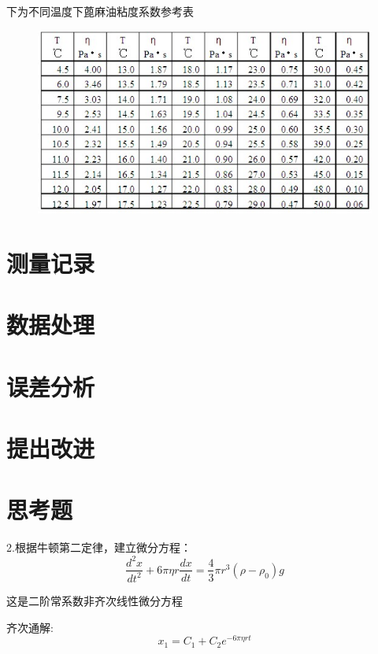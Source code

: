 \documentclass[UTF8]{ctexart}
\begin{document}
下为不同温度下蓖麻油粘度系数参考表
\begin{figure}[ht]
    \centering 
    \includegraphics[width=13cm]{standard table.jpeg}
\end{figure}




    \section{测量记录}

    \section{数据处理}

    \section{误差分析}

    \section{提出改进}
    
    \section{思考题}
    2.根据牛顿第二定律，建立微分方程：
    \begin{equation}
        \frac{d^2x}{dt^2}+6\pi\eta r\frac{dx}{dt}=\frac 43 \pi r^3(\rho -\rho _0)g
    \end{equation}

    这是二阶常系数非齐次线性微分方程\cite{shufen}
    
    齐次通解:
    \begin{equation}
        x_1=C_1+C_2e^{-6\pi \eta rt}
    \end{equation}
\end{document}
